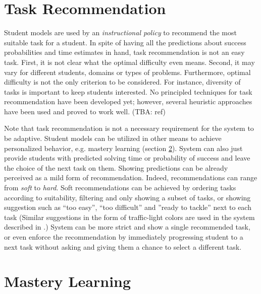 
\section{Task Recommendation}
\label{sec:task-recommendation}

Student models are used by an \emph{instructional policy} to recommend
  the most suitable task for a student.
In spite of having all the predictions about success probabilities
  and time estimates in hand,
  task recommendation is not an easy task.
First, it is not clear what the optimal difficulty even means.
Second, it may vary for different students, domains or types of problems.
Furthermore, optimal difficulty is not the only criterion to be considered.
For instance, diversity of tasks is important to keep students interested.
No principled techniques for task recommendation have been developed yet;
however, several heuristic approaches have been used
  and proved to work well. (TBA: ref)


Note that task recommendation is not a necessary requirement
  for the system to be adaptive.
Student models can be utilized in other means to achieve personalized behavior,
  e.g. mastery learning (section \ref{sec:mastery-learning}).
System can also just provide students with predicted solving time
  or probability of success
  and leave the choice of the next task on them.
Showing predictions can be already perceived as a mild form of recommendation.
Indeed, recommendations can range from \emph{soft} to \emph{hard}.
Soft recommendations can be achieved by
  ordering tasks according to suitability,
  filtering and only showing a subset of tasks,
  or showing suggestion such as
  ``too easy'', ``too difficult'' and ''ready to tackle'' next to each task
  (Similar suggestions in the form of traffic-light colors
  are used in the system described in \cite{its-programming}.)
System can be more strict and show a single recommended task,
  or even enforce the recommendation by immediately progressing student to
  a next task without asking and giving them a chance to select a different task.


\section{Mastery Learning}
\label{sec:mastery-learning}

